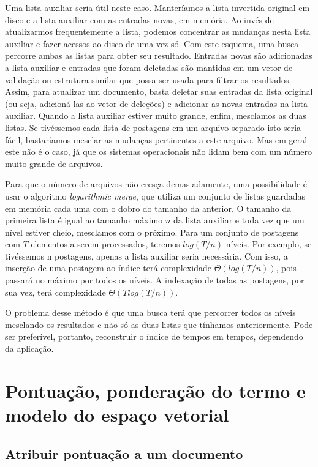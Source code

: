 Uma lista auxiliar seria útil neste caso. Manteríamos a lista invertida original em disco e a lista auxiliar com as entradas novas, em memória. Ao invés de atualizarmos frequentemente a lista, podemos concentrar as mudanças nesta lista auxiliar e fazer acessos ao disco de uma vez só. Com este esquema, uma busca percorre ambas as listas para obter seu resultado. Entradas novas são adicionadas a lista auxiliar e entradas que foram deletadas são mantidas em um vetor de validação ou estrutura similar que possa ser usada para filtrar os resultados. Assim, para atualizar um documento, basta deletar suas entradas da lista original (ou seja, adicioná-las ao vetor de deleções) e adicionar as novas entradas na lista auxiliar. Quando a lista auxiliar estiver muito grande, enfim, mesclamos as duas listas. Se tivéssemos cada lista de postagens em um arquivo separado isto seria fácil, bastaríamos mesclar as mudanças pertinentes a este arquivo. Mas em geral este não é o caso, já que os sistemas operacionais não lidam bem com um número muito grande de arquivos. 

Para que o número de arquivos não cresça demasiadamente, uma possibilidade é usar o algoritmo \emph{logarithmic merge}, que utiliza um conjunto de listas guardadas em memória cada uma com o dobro do tamanho da anterior. O tamanho da primeira lista é igual ao tamanho máximo $n$ da lista auxiliar e toda vez que um nível estiver cheio, mesclamos com o próximo. Para um conjunto de postagens com $T$ elementos a serem processados, teremos $log( T/n )$ níveis. Por exemplo, se tivéssemos n postagens, apenas a lista auxiliar seria necessária. Com isso, a inserção de uma postagem ao índice terá complexidade $\Theta( log( T/n ))$, pois passará no máximo por todos os níveis. A indexação de todas as postagens, por sua vez, terá complexidade $\Theta( T log(T/n ))$.

O problema desse método é que uma busca terá que percorrer todos os níveis mesclando os resultados e não só as duas listas que tínhamos anteriormente. Pode ser preferível, portanto, reconstruir o índice de tempos em tempos, dependendo da aplicação.

\section{Pontuação, ponderação do termo e modelo do espaço vetorial}
\label{sec:espaco_vetorial}

\subsection{Atribuir pontuação a um documento}

